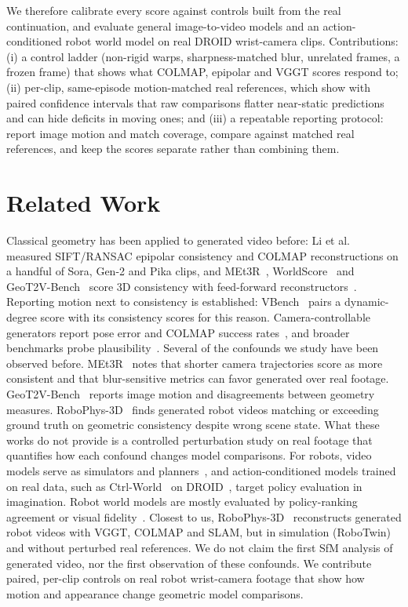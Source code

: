 \documentclass{article}
\begin{document}
We therefore calibrate every score against controls built from the real continuation, and evaluate
general image-to-video models and an action-conditioned robot world model on real DROID wrist-camera
clips. Contributions: (i) a control ladder (non-rigid warps, sharpness-matched blur, unrelated
frames, a frozen frame) that shows what COLMAP, epipolar and VGGT scores respond to; (ii) per-clip,
same-episode motion-matched real references, which show with paired confidence intervals that raw
comparisons flatter near-static predictions and can hide deficits in moving ones; and (iii) a
repeatable reporting protocol: report image motion and match coverage, compare against matched real
references, and keep the scores separate rather than combining them.

\section{Related Work}
Classical geometry has been applied to generated video before: Li et al.~\citep{li2024sora} measured
SIFT/RANSAC epipolar consistency and COLMAP reconstructions on a handful of Sora, Gen-2 and Pika
clips, and MEt3R~\citep{asim2025met3r}, WorldScore~\citep{duan2025worldscore} and
GeoT2V-Bench~\citep{fan2026geot2v} score 3D consistency with feed-forward
reconstructors~\citep{wang2024dust3r,leroy2024mast3r,wang2025vggt}. Reporting motion next to
consistency is established: VBench~\citep{huang2024vbench} pairs a dynamic-degree score with its
consistency scores for this reason. Camera-controllable
generators report pose error and COLMAP success rates~\citep{he2024cameractrl,xu2024camco,bahmani2025ac3d},
and broader benchmarks probe plausibility~\citep{huang2024vbench,li2025worldmodelbench,motamed2025physicsiq}. Several of the
confounds we study have been observed before. MEt3R~\citep{asim2025met3r} notes that shorter camera
trajectories score as more consistent and that blur-sensitive metrics can favor generated over real
footage. GeoT2V-Bench~\citep{fan2026geot2v} reports image motion and disagreements between geometry
measures. RoboPhys-3D~\citep{wang2026robophys3d} finds generated robot videos matching or exceeding
ground truth on geometric consistency despite wrong scene state. What
these works do not provide is a controlled perturbation study on real footage that quantifies how
each confound changes model comparisons. For robots, video models serve as simulators and
planners~\citep{yang2024unisim,du2023unipi,ko2024avdc,zhu2025irasim,nvidia2025cosmos,jang2025dreamgen},
and action-conditioned models trained on real data, such as Ctrl-World~\citep{guo2026ctrlworld} on
DROID~\citep{khazatsky2024droid}, target policy evaluation in imagination. Robot world models are
mostly evaluated by policy-ranking agreement or visual
fidelity~\citep{quevedo2025worldgym,li2025worldeval,yue2025ewmbench}. Closest to us,
RoboPhys-3D~\citep{wang2026robophys3d} reconstructs generated robot videos with VGGT, COLMAP and SLAM,
but in simulation (RoboTwin) and without perturbed real references. We do not claim the first SfM
analysis of generated video, nor the first observation of these confounds. We contribute paired,
per-clip controls on real robot wrist-camera footage that show how motion and appearance change
geometric model comparisons.
\end{document}

